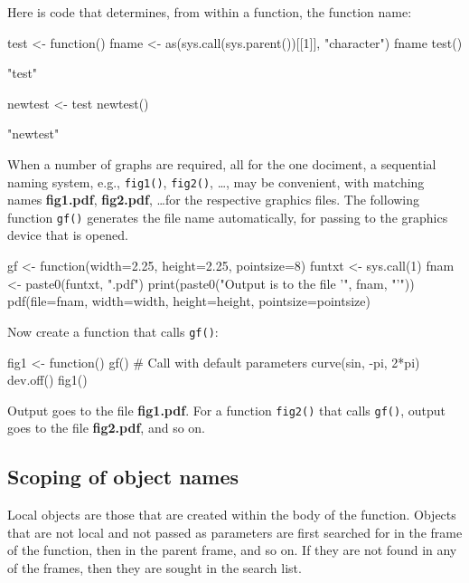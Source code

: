 \documentclass{tufte-book}\usepackage[]{graphicx}\usepackage[]{color}
\newcommand{\txtt}[1]{\texttt{#1}}
\begin{document}
Here is code that determines, from within a function,
the function name:
\begin{Schunk}
\begin{Sinput}
test <- function(){
 fname <- as(sys.call(sys.parent())[[1]],
              "character")
  fname
}
test()
\end{Sinput}
\begin{Soutput}
[1] "test"
\end{Soutput}
\begin{Sinput}
newtest <- test
newtest()
\end{Sinput}
\begin{Soutput}
[1] "newtest"
\end{Soutput}
\end{Schunk}

When a number of graphs are required, all for the one dociment, a
sequential naming system, e.g., \txtt{fig1()}, \txtt{fig2()}, \ldots,
may be convenient, with matching names \textbf{fig1.pdf},
\textbf{fig2.pdf}, \ldots for the respective graphics files.  The
following function \txtt{gf()} generates the file name automatically,
for passing to the graphics device that is opened.
\begin{Schunk}
\begin{Sinput}
gf <-
    function(width=2.25, height=2.25, pointsize=8){
        funtxt <- sys.call(1)
        fnam <- paste0(funtxt, ".pdf")
        print(paste0("Output is to the file '",
                     fnam, "'"))
        pdf(file=fnam, width=width, height=height,
            pointsize=pointsize)
    }
\end{Sinput}
\end{Schunk}

Now create a function that calls \txtt{gf()}:
\begin{Schunk}
\begin{Sinput}
fig1 <- function(){
    gf()             # Call with default parameters
    curve(sin, -pi, 2*pi)
    dev.off()
}
fig1()
\end{Sinput}
\end{Schunk}
\noindent
Output goes to the file \textbf{fig1.pdf}.  For a function
\txtt{fig2()} that calls \txtt{gf()}, output goes to the file
\textbf{fig2.pdf}, and so on.

\subsection*{Scoping of object names}
Local objects are those that are created within the body of the
function.  Objects that are not local and not passed as parameters are
first searched for in the frame of the function, then in the parent
frame, and so on. If they are not found in any of the frames, then
they are sought in the search list.
\end{document}
